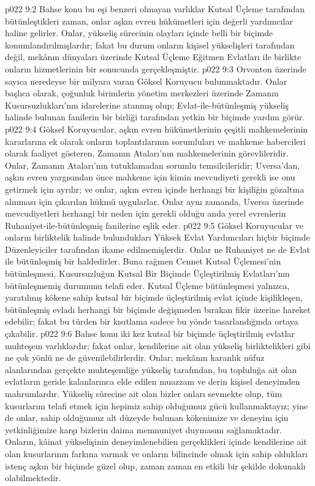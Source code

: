 \vs p022 9:2 Bahse konu bu eşi benzeri olmayan varlıklar Kutsal Üçleme tarafından bütünleştikleri zaman, onlar aşkın evren hükümetleri için değerli yardımcılar haline gelirler. Onlar, yükseliş sürecinin olayları içinde belli bir biçimde konumlandırılmışlardır; fakat bu durum onların kişisel yükselişleri tarafından değil, mekânın dünyaları üzerinde Kutsal Üçleme Eğitmen Evlatları ile birlikte onların hizmetlerinin bir sonucunda gerçekleşmiştir.
\vs p022 9:3 Orvonton üzerinde sayıca neredeyse bir milyara varan Göksel Koruyucu bulunmaktadır. Onlar başlıca olarak, çoğunluk birimlerin yönetim merkezleri üzerinde Zamanın Kusursuzlukları’nın idarelerine atanmış olup; Evlat\hyp{}ile\hyp{}bütünleşmiş yükseliş halinde bulunan fanilerin bir birliği tarafından yetkin bir biçimde yardım görür.
\vs p022 9:4 Göksel Koruyucular, aşkın evren hükümetlerinin çeşitli mahkemelerinin kararlarına ek olarak onların toplantılarının sorumluları ve mahkeme habercileri olarak faaliyet gösteren, Zamanın Ataları’nın mahkemelerinin görevlileridir. Onlar, Zamanın Ataları’nın tutuklamadan sorumlu temsilcileridir; Uversa’dan, aşkın evren yargısından önce mahkeme için kimin mevcudiyeti gerekli ise onu getirmek için ayrılır; ve onlar, aşkın evren içinde herhangi bir kişiliğin gözaltına alınması için çıkarılan hükmü uygularlar. Onlar aynı zamanda, Uversa üzerinde mevcudiyetleri herhangi bir neden için gerekli olduğu anda yerel evrenlerin Ruhaniyet\hyp{}ile\hyp{}bütünleşmiş fanilerine eşlik eder.
\vs p022 9:5 Göksel Koruyucular ve onların birliktelik halinde bulundukları Yüksek Evlat Yardımcıları hiçbir biçimde Düzenleyiciler tarafından ikame edilmemişlerdir. Onlar ne Ruhaniyet ne de Evlat ile bütünleşmiş bir haldedirler. Buna rağmen Cennet Kutsal Üçlemesi’nin bütünleşmesi, Kusursuzluğun Kutsal Bir Biçimde Üçleştirilmiş Evlatları’nın bütünleşmemiş durumunu telafi eder. Kutsal Üçleme bütünleşmesi yalnızca, yaratılmış kökene sahip kutsal bir biçimde üçleştirilmiş evlat içinde kişilikleşen, bütünleşmiş evladı herhangi bir biçimde değişmeden bırakan fikir üzerine hareket edebilir; fakat bu türden bir kısıtlama sadece bu yönde tasarlandığında ortaya çıkabilir.
\vs p022 9:6 Bahse konu iki kez kutsal bir biçimde üçleştirilmiş evlatlar muhteşem varlıklardır; fakat onlar, kendilerine ait olan yükseliş birliktelikleri gibi ne çok yönlü ne de güvenilebilirlerdir. Onlar; mekânın karanlık nüfuz alanlarından gerçekte muhteşemliğe yükseliş tarafından, bu topluluğa ait olan evlatların geride kalanlarınca elde edilen muazzam ve derin kişisel deneyimden mahrumlardır. Yükseliş sürecine ait olan bizler onları sevmekte olup, tüm kusurlarını telafi etmek için hepimiz sahip olduğumuz gücü kullanmaktayız; yine de onlar, sahip olduğumuz alt düzeyde bulunan kökenimize ve deneyim için yetkinliğimize karşı bizlerin daima memnuniyet duymasını sağlamaktadır. Onların, kâinat yükselişinin deneyimlenebilien gerçeklikleri içinde kendilerine ait olan kusurlarının farkına varmak ve onların bilincinde olmak için sahip oldukları istenç aşkın bir biçimde güzel olup, zaman zaman en etkili bir şekilde dokunaklı olabilmektedir.
